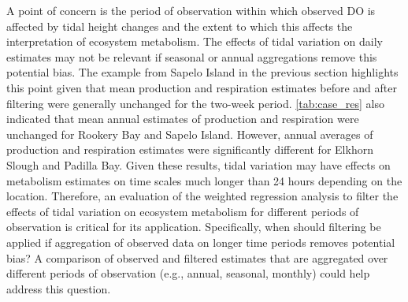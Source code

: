 \documentclass[letterpaper,12pt,oneside]{article}\usepackage[]{graphicx}\usepackage[]{color}
\begin{document}
A point of concern is the period of observation within which observed \ac{DO} is affected by tidal height changes and the extent to which this affects the interpretation of ecosystem metabolism.  The effects of tidal variation on daily estimates may not be relevant if seasonal or annual aggregations remove this potential bias.  The example from Sapelo Island in the previous section highlights this point given that mean production and respiration estimates before and after filtering were generally unchanged for the two-week period. \cref{tab:case_res} also indicated that mean annual estimates of production and respiration were unchanged for Rookery Bay and Sapelo Island.  However, annual averages of production and respiration estimates were significantly different for Elkhorn Slough and Padilla Bay. Given these results, tidal variation may have effects on metabolism estimates on time scales much longer than 24 hours depending on the location.  Therefore, an evaluation of the weighted regression analysis to filter the effects of tidal variation on ecosystem metabolism for different periods of observation is critical for its application.  Specifically, when should filtering be applied if aggregation of observed data on longer time periods removes potential bias?  A comparison of observed and filtered estimates that are aggregated over different periods of observation (e.g., annual, seasonal, monthly) could help address this question.
\end{document}

